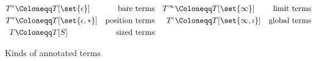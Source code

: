 \begin{figure}
\begin{align*}
T^\circ  &\Coloneqq T[\set{\epsilon}]      &\text{bare terms}     &&T^\infty &\Coloneqq T[\set{\infty}]        &\text{limit terms} \\
T^*      &\Coloneqq T[\set{\epsilon, *}]   &\text{position terms} &&T^\iota  &\Coloneqq T[\set{\infty, \iota}] &\text{global terms} \\
T        &\Coloneqq T[S]                   &\text{sized terms}
\end{align*}
\caption{Kinds of annotated terms}
\label{fig:terms-specific}
\end{figure}

